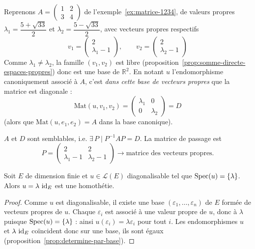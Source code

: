 \begin{exemple}
Reprenons $A=\begin{pmatrix} 1 & 2 \\ 3 & 4\end{pmatrix}$ de l'exemple~\ref{ex:matrice-1234}, de valeurs propres $\lambda_1=\dfrac{5+\sqrt{33}}{2}$ et $\lambda_2=\dfrac{5-\sqrt{33}}{2}$, avec vecteurs propres respectifs
\[v_1 = \begin{pmatrix} 2 \\ \lambda_1-1\end{pmatrix}, \qquad v_2 = \begin{pmatrix} 2 \\ \lambda_2-1\end{pmatrix}\]
Comme $\lambda_1\neq\lambda_2$, la famille $(v_1,v_2)$ est libre (proposition~\ref{prop:somme-directe-espaces-propres}) donc est une base de $\mathbb{R}^2$. En notant $u$ l'endomorphisme canoniquement associé à $A$, c'est \emph{dans cette base de vecteurs propres} que la matrice est diagonale :
\[\mathrm{Mat}(u,v_1,v_2) = \begin{pmatrix} \lambda_1 & 0 \\ 0 & \lambda_2\end{pmatrix} = D\]
(alors que $\mathrm{Mat}(u,e_1,e_2)=A$ dans la base canonique).

$A$ et $D$ sont semblables, i.e. $\exists\, P \mid P^{-1}AP=D$. La matrice de passage est
\[P = \begin{pmatrix} 2 & 2 \\ \lambda_1-1 & \lambda_2-1\end{pmatrix} \longrightarrow \text{matrice des vecteurs propres.}\]
\end{exemple}

\begin{prop}
\label{prop:singleton-homothetie}
Soit $E$ de dimension finie et $u\in\mathcal{L}(E)$ diagonalisable tel que $\operatorname{Spec}(u)=\{\lambda\}$. Alors $u=\lambda\,\operatorname{id}_E$ est une homothétie.
\end{prop}

\begin{proof}
Comme $u$ est diagonalisable, il existe une base $(\varepsilon_1,\dots,\varepsilon_n)$ de $E$ formée de vecteurs propres de $u$. Chaque $\varepsilon_i$ est associé à une valeur propre de $u$, donc à $\lambda$ puisque $\operatorname{Spec}(u)=\{\lambda\}$ : ainsi $u(\varepsilon_i)=\lambda\varepsilon_i$ pour tout $i$. Les endomorphismes $u$ et $\lambda\,\operatorname{id}_E$ coïncident donc sur une base, ils sont égaux (proposition~\ref{prop:determine-par-base}).
\end{proof}


